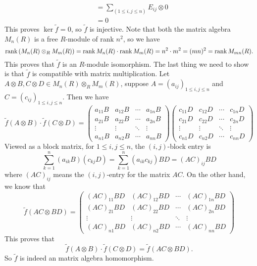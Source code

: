 \documentclass[a4paper, 12pt]{article}
\begin{document}
\begin{solution}
\begin{align*}
		  &=\sum_(1\leq i,j\leq n)E_{ij}\otimes 0\\ 
		  &=0
\end{align*}
This proves \(\ker \tilde{f}=0\), so \(\tilde{f}\) is injective. Note that both the matrix algebra \(M_n(R)\) is a free \(R\)-module of rank \(n^2\), so we have 
\[\text{rank}\,(M_n(R)\otimes_R M_m(R))=\text{rank}\, M_n(R)\cdot \text{rank}\, M_m(R)=n^2\cdot m^2=(mn)^2=\text{rank}\, M_{mn}(R).\]
This proves that \(\tilde{f}\) is an \(R\)-module isomorphism. The last thing we need to show is that \(\tilde{f}\) is compatible with matrix multiplication. Let \(A\otimes B, C\otimes D\in M_n(R)\otimes_R M_m(R)\), suppose 
\(A=(a_{ij})_{1\leq i,j\leq n}\) and \(C=(c_{ij})_{1\leq i,j\leq n}\). Then we have 
\[\tilde{f}(A\otimes B)\cdot \tilde{f}(C\otimes D)=\begin{pmatrix}
	a_{11}B&a_{12}B&\cdots&a_{1n}B\\ 
		a_{21}B&a_{22}B&\cdots&a_{2n}B\\ 
		\vdots&\vdots&\ddots&\vdots\\ 
		a_{n1}B&a_{n2}B&\cdots&a_{nn}B
\end{pmatrix}\begin{pmatrix}
	c_{11}D&c_{12}D&\cdots&c_{1n}D\\ 
		c_{21}D&c_{22}D&\cdots&c_{2n}D\\ 
		\vdots&\vdots&\ddots&\vdots\\ 
		c_{n1}D&c_{n2}D&\cdots&c_{nn}D
\end{pmatrix}\]
Viewed as a block matrix, for \(1\leq i,j\leq n\), the \((i,j)\)-block entry is 
\[\sum_{k=1}^n (a_{ik}B)(c_{kj}D)=\sum_{k=1}^{n} (a_{ik}c_{kj})BD=(AC)_{ij}BD\]
where \((AC)_{ij}\) means the \((i,j)\)-entry for the matrix \(AC\). On the other hand, we know that 
\[\tilde{f}(AC\otimes BD)=\begin{pmatrix}
	(AC)_{11}BD&(AC)_{12}BD& \cdots&(AC)_{1n}BD\\ 
	(AC)_{21}BD&(AC)_{22}BD&\cdots&(AC)_{2n}BD\\ 
	\vdots&\vdots&\ddots&\vdots\\ 
	(AC)_{n1}BD&(AC)_{n2}BD&\cdots&(AC)_{nn}BD
\end{pmatrix}\]
This proves that 
\[\tilde{f}(A\otimes B)\cdot \tilde{f}(C\otimes D)=\tilde{f}(AC\otimes BD).\]
So \(\tilde{f}\) is indeed an matrix algebra homomorphism. 
\end{solution}
\end{document}
